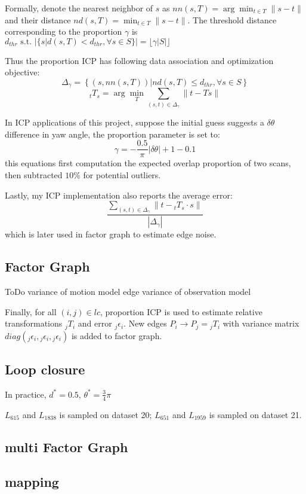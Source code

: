 \documentclass[conference]{IEEEtran}
\begin{document}
Formally, denote the nearest neighbor of $s$ as $nn(s, T) = \arg\min_{t \in T} \|s - t\|$ 
and their distance $nd(s, T) = \min_{t \in T} \|s - t\|$.
The threshold distance corresponding to the proportion $\gamma$ is 
$d_{thr} \text{ s.t. } |\{s | d(s, T) < d_{thr}, \forall s \in S\}| = \lfloor\gamma |S| \rfloor$

Thus the proportion ICP has following data association and optimization objective:
$$ \Delta_\gamma = \left\{\left(s, nn(s,T) \right) | nd(s,T) \le d_{thr}, \forall s\in S\right\}$$
$$_tT_s = \arg\min_T \sum\limits_{(s,t)\in\Delta_\gamma} \|t - Ts\|$$

In ICP applications of this project,
suppose the initial guess suggests a $\delta\theta$ difference in yaw angle,
the proportion parameter is set to:
$$\gamma = -\frac{0.5}{\pi}|\delta\theta| + 1 - 0.1$$
this equations first computation the expected overlap proportion of two scans, 
then subtracted $10\%$ for potential outliers.

Lastly, my ICP implementation also reports the average error:
$$\frac{\sum\limits_{(s,t)\in\Delta_\gamma} \|t - {}_tT_s\cdot s\|}{|\Delta_\gamma|}$$
which is later used in factor graph to estimate edge noise.

\subsection{Factor Graph}
ToDo
variance of motion model edge
variance of observation model

Finally, for all $(i, j)\in lc$, proportion ICP is used to 
estimate relative transformations $_jT_i$ and 
error $_j\epsilon_i$. New edges $P_i\rightarrow P_j = {}_jT_i$ with 
variance matrix $diag({}_j\epsilon_i, {}_j\epsilon_i, {}_j\epsilon_i)$ 
is added to factor graph.

\subsection{Loop closure}

In practice, 
$d^* = 0.5$, $\theta^* = \frac 3 4 \pi$

$L_{615}$ and $L_{1838}$ is sampled on dataset 20; 
$L_{651}$ and $L_{1959}$ is sampled on dataset 21.

\subsection{multi Factor Graph}


\subsection{mapping}
\end{document}
